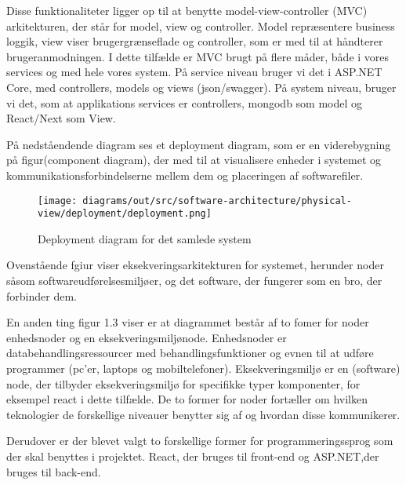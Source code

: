 Disse funktionaliteter ligger op til at benytte model-view-controller (MVC) arkitekturen, der står for model, view og controller. Model repræsentere business loggik, view viser brugergrænseflade og controller, som er med til at håndterer brugeranmodningen. I dette tilfælde er MVC brugt på flere måder, både i vores services og med hele vores system. På service niveau bruger vi det i ASP.NET Core, med controllers, models og views (json/swagger). På system niveau, bruger vi det, som at applikations services er  controllers, mongodb som model og React/Next som View.

På nedståendende diagram ses et deployment diagram, som er en viderebygning på figur(component diagram), der med til at visualisere enheder i systemet og kommunikationsforbindelserne mellem dem og placeringen af softwarefiler.

\begin{figure}[ht]
    \centering
\texttt{[image: diagrams/out/src/software-architecture/physical-view/deployment/deployment.png]}
\caption{Deployment diagram for det samlede system}
\label{fig:figure2}
\end{figure}

Ovenstående fgiur viser eksekveringsarkitekturen for systemet, herunder noder såsom softwareudførelsesmiljøer, og det software, der fungerer som en bro, der  forbinder dem. 

En anden ting figur 1.3 viser er at diagrammet består af to fomer for noder enhedsnoder og en eksekveringsmiljønode. Enhedsnoder er  databehandlingsressourcer med behandlingsfunktioner og evnen til at udføre programmer (pc'er, laptops og mobiltelefoner).  Eksekveringsmiljø er en (software) node, der tilbyder eksekveringsmiljø for specifikke typer komponenter, for eksempel react i dette tilfælde. De to former for noder fortæller om hvilken teknologier de forskellige niveauer benytter sig af og hvordan disse kommunikerer.

Derudover er der blevet valgt to forskellige former for programmeringssprog som der skal benyttes i projektet. React, der bruges til front-end og ASP.NET,der bruges til back-end. 

